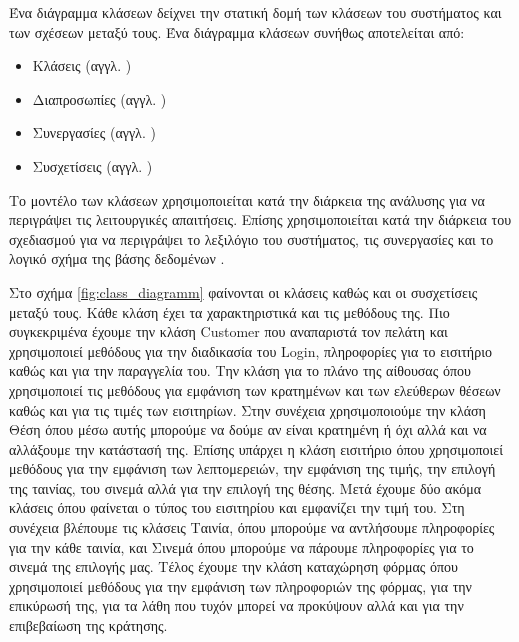 \documentclass{assignment}
\begin{document}
Ένα διάγραμμα κλάσεων δείχνει την στατική δομή των κλάσεων του συστήματος και των σχέσεων μεταξύ τους. Ένα διάγραμμα κλάσεων συνήθως αποτελείται από:

\begin{itemize}
\item Κλάσεις (αγγλ. )
\item Διαπροσωπίες (αγγλ. )
\item Συνεργασίες (αγγλ. )
\item Συσχετίσεις (αγγλ. )
\end{itemize}

Το μοντέλο των κλάσεων χρησιμοποιείται κατά την διάρκεια της ανάλυσης για να περιγράψει τις λειτουργικές απαιτήσεις. Επίσης χρησιμοποιείται κατά την διάρκεια του σχεδιασμού για να περιγράψει το λεξιλόγιο του συστήματος, τις συνεργασίες και το λογικό σχήμα της βάσης δεδομένων \cite{Rumbaugh:2004:UML:993859}.

Στο σχήμα \ref{fig:class_diagramm} φαίνονται οι κλάσεις καθώς και οι συσχετίσεις μεταξύ τους. Κάθε κλάση έχει τα χαρακτηριστικά και τις μεθόδους της. Πιο συγκεκριμένα έχουμε την κλάση Customer που αναπαριστά τον πελάτη και χρησιμοποιεί μεθόδους για την διαδικασία του Login, πληροφορίες για το εισιτήριο καθώς και για την παραγγελία του. Την κλάση για το πλάνο της αίθουσας όπου χρησιμοποιεί τις μεθόδους για εμφάνιση των κρατημένων και των ελεύθερων θέσεων καθώς και για τις τιμές των εισιτηρίων. Στην συνέχεια χρησιμοποιούμε την κλάση Θέση όπου μέσω αυτής μπορούμε να δούμε αν είναι κρατημένη ή όχι αλλά και να αλλάξουμε την κατάστασή της. Επίσης υπάρχει η κλάση εισιτήριο όπου χρησιμοποιεί μεθόδους για την εμφάνιση των λεπτομερειών, την εμφάνιση της τιμής, την επιλογή της ταινίας, του σινεμά αλλά για την επιλογή της θέσης. Μετά έχουμε δύο ακόμα κλάσεις όπου φαίνεται ο τύπος του εισιτηρίου και εμφανίζει την τιμή του. Στη συνέχεια βλέπουμε τις κλάσεις Ταινία, όπου μπορούμε να αντλήσουμε πληροφορίες για την κάθε ταινία, και Σινεμά όπου μπορούμε να πάρουμε πληροφορίες για το σινεμά της επιλογής μας. Τέλος έχουμε την κλάση καταχώρηση φόρμας όπου χρησιμοποιεί μεθόδους για την εμφάνιση των πληροφοριών της φόρμας, για την επικύρωσή της, για τα λάθη που τυχόν μπορεί να προκύψουν αλλά και για την επιβεβαίωση της κράτησης.
\end{document}
